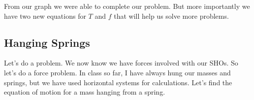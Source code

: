 \documentclass{book}
\begin{document}
From our graph we were able to complete our problem. But more importantly we
have two new equations for $T$ and $f$ that will help us solve more problems.

\subsection{Hanging Springs}

Let's do a problem. We now know we have forces involved with our SHOs. So
let's do a force problem. In class so far, I have always hung our masses and
springs, but we have used horizontal systems for calculations. Let's find
the equation of motion for a mass hanging from a spring.

\end{document}
